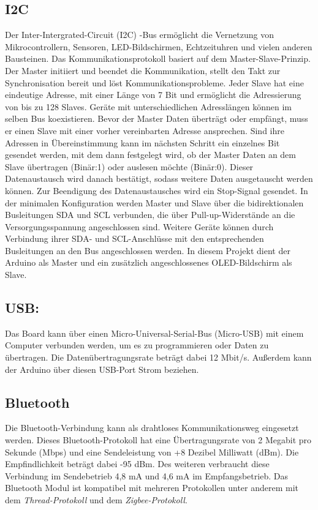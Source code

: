 \subsection{I2C}
Der Inter-Intergrated-Circuit (I2C) -Bus ermöglicht die Vernetzung von Mikrocontrollern, Sensoren, LED-Bildschirmen, Echtzeituhren und vielen anderen Bausteinen. Das Kommunikationsprotokoll basiert auf dem Master-Slave-Prinzip. Der Master initiiert und beendet die Kommunikation, stellt den Takt zur Synchronisation bereit und löst Kommunikationsprobleme. Jeder Slave hat eine eindeutige Adresse, mit einer Länge von 7 Bit und ermöglicht die Adressierung von bis zu 128 Slaves. Geräte mit unterschiedlichen Adresslängen können im selben Bus koexistieren. Bevor der Master Daten überträgt oder empfängt, muss er einen Slave mit einer vorher vereinbarten Adresse ansprechen.\cite{Meroth.2018}\cite{STM1.2015} Sind ihre Adressen in Übereinstimmung kann im nächsten Schritt ein einzelnes Bit gesendet werden, mit dem dann festgelegt wird, ob der Master Daten an dem Slave übertragen (Binär:1) oder auslesen möchte (Binär:0). Dieser Datenaustausch wird danach bestätigt, sodass weitere Daten ausgetauscht werden können. Zur Beendigung des Datenaustausches wird ein Stop-Signal gesendet.\cite{Gehrke.2022} In der minimalen Konfiguration werden Master und Slave über die bidirektionalen Busleitungen SDA und SCL verbunden, die über Pull-up-Widerstände an die Versorgungsspannung angeschlossen sind. Weitere Geräte können durch Verbindung ihrer SDA- und SCL-Anschlüsse mit den entsprechenden Busleitungen an den Bus angeschlossen werden.\cite{Meroth.2018} In diesem Projekt dient der Arduino als Master und ein zusätzlich angeschlossenes OLED-Bildschirm als Slave.

\subsection{USB:}
Das Board kann über einen Micro-Universal-Serial-Bus (Micro-USB) mit einem Computer verbunden werden, um es zu programmieren oder Daten zu übertragen. Die Datenübertragungsrate beträgt dabei 12 Mbit/s. Außerdem kann der Arduino über diesen USB-Port Strom beziehen.

\subsection{Bluetooth}
Die Bluetooth-Verbindung kann als drahtloses Kommunikationsweg eingesetzt werden. Dieses Bluetooth-Protokoll hat eine Übertragungsrate von 2 Megabit pro Sekunde (Mbps) und eine Sendeleistung von +8 Dezibel Milliwatt (dBm). Die Empfindlichkeit beträgt dabei -95 dBm. Des weiteren verbraucht diese Verbindung im Sendebetrieb 4,8 mA und 4,6 mA im Empfangsbetrieb. Das Bluetooth Modul ist kompatibel mit mehreren Protokollen unter anderem mit dem \textit{Thread-Protokoll} und dem \textit{Zigbee-Protokoll}.\cite{Ard.2024} \cite{NrdSem4.2024}


